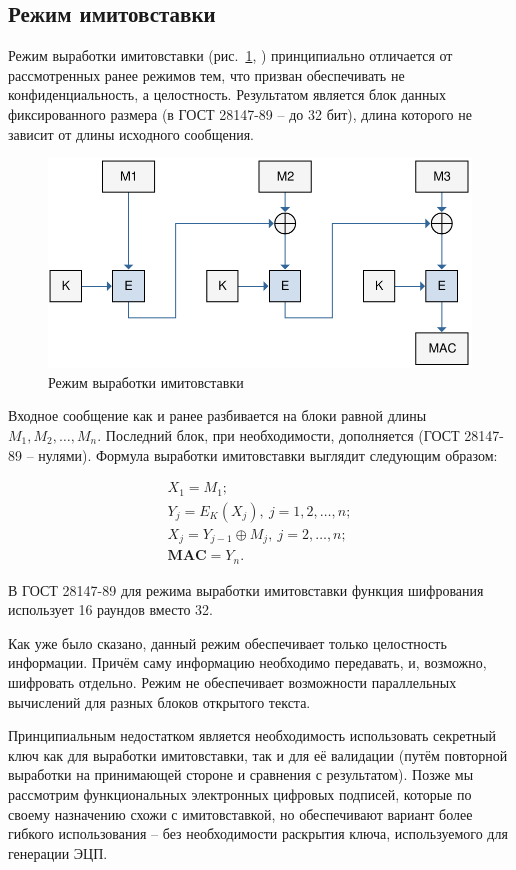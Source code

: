 \subsection{Режим имитовставки}

Режим выработки имитовставки (рис.~\ref{fig:GOST_MAC}, \cite{GOST-89}) принципиально отличается от рассмотренных ранее режимов тем, что призван обеспечивать не конфиденциальность, а целостность. Результатом является блок данных фиксированного размера (в ГОСТ 28147-89 -- до 32 бит), длина которого не зависит от длины исходного сообщения.

\begin{figure}[bt]
	\centering
	\includegraphics[width=1\textwidth]{pic/GOST_MAC}
	\caption{Режим выработки имитовставки}
	\label{fig:GOST_MAC}
\end{figure}

Входное сообщение как и ранее разбивается на блоки равной длины $M_1, M_2, \dots, M_n$. Последний блок, при необходимости, дополняется (ГОСТ 28147-89 -- нулями). Формула выработки имитовставки выглядит следующим образом:

\[ \begin{array}{l}
	X_1 = M_1; \\
	Y_j = E_K ( X_j ), ~ j = 1, 2, \dots, n; \\
	X_j = Y_{j-1} \oplus M_j, ~ j = 2, \dots, n; \\
	\textbf{MAC} = Y_n.
\end{array} \]

В ГОСТ 28147-89 для режима выработки имитовставки функция шифрования использует 16 раундов вместо 32.

Как уже было сказано, данный режим обеспечивает только целостность информации. Причём саму информацию необходимо передавать, и, возможно, шифровать отдельно. Режим не обеспечивает возможности параллельных вычислений для разных блоков открытого текста.

Принципиальным недостатком является необходимость использовать секретный ключ как для выработки имитовставки, так и для её валидации (путём повторной выработки на принимающей стороне и сравнения с результатом). Позже мы рассмотрим функциональных электронных цифровых подписей, которые по своему назначению схожи с имитовставкой, но обеспечивают вариант более гибкого использования -- без необходимости раскрытия ключа, используемого для генерации ЭЦП.

